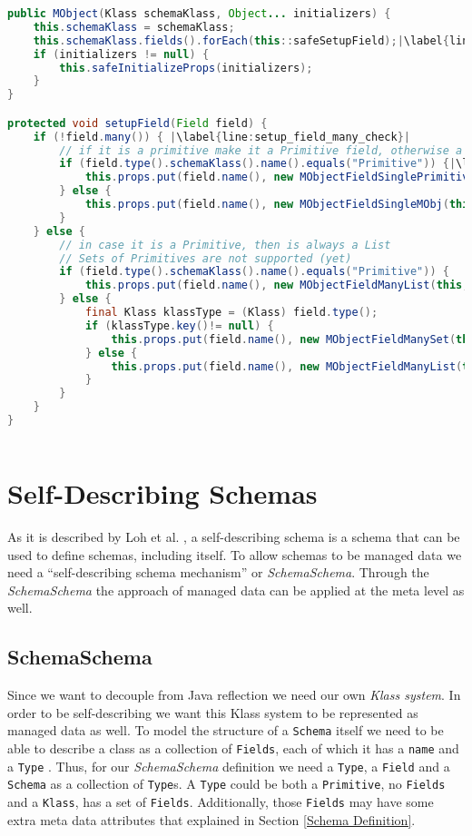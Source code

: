 \begin{sourcecode} [H]
	\begin{lstlisting}[language=Java, escapechar=|]
public MObject(Klass schemaKlass, Object... initializers) {
	this.schemaKlass = schemaKlass;
	this.schemaKlass.fields().forEach(this::safeSetupField);|\label{line:setup_fields}|
	if (initializers != null) {
		this.safeInitializeProps(initializers);
	}
}

protected void setupField(Field field) {
	if (!field.many()) { |\label{line:setup_field_many_check}|
		// if it is a primitive make it a Primitive field, otherwise a reference (managed object)
		if (field.type().schemaKlass().name().equals("Primitive")) {|\label{line:instanceof}|
			this.props.put(field.name(), new MObjectFieldSinglePrimitive(this, field));
		} else {
			this.props.put(field.name(), new MObjectFieldSingleMObj(this, field));
		}
	} else {
		// in case it is a Primitive, then is always a List
		// Sets of Primitives are not supported (yet)
		if (field.type().schemaKlass().name().equals("Primitive")) {
			this.props.put(field.name(), new MObjectFieldManyList(this, field));
		} else {
			final Klass klassType = (Klass) field.type();
			if (klassType.key()!= null) {
				this.props.put(field.name(), new MObjectFieldManySet(this, field));
			} else {
				this.props.put(field.name(), new MObjectFieldManyList(this, field));
			}
		}
	}
}
	\end{lstlisting}
	\caption{MObject: setup fields}
	\label{lst:setup_fields}
\end{sourcecode}

\section{Self-Describing Schemas}\label{Self-Describing Schemas}
As it is described by Loh et al. \cite{loh2012managed}, a self-describing schema is a schema that can be used to define schemas, including itself.
To allow schemas to be managed data we need a ``self-describing schema mechanism'' or \textit{SchemaSchema}.
Through the \textit{SchemaSchema} the approach of managed data can be applied at the meta level as well.

\subsection{SchemaSchema}\label{sec:SchemaSchema}
Since we want to decouple from Java reflection we need our own \textit{Klass system}. 
In order to be self-describing we want this Klass system to be represented as managed data as well. 
To model the structure of a \texttt{Schema} itself we need to be able to describe a class as a collection of \texttt{Fields}, each of which it has a \texttt{name} and a \texttt{Type} \cite{loh2012managed}. 
Thus, for our \textit{SchemaSchema} definition we need a \texttt{Type}, a \texttt{Field} and a \texttt{Schema} as a collection of \texttt{Type}s. 
A \texttt{Type} could be both a \texttt{Primitive}, no \texttt{Fields} and a \texttt{Klass}, has a set of \texttt{Fields}.
Additionally, those \texttt{Fields} may have some extra meta data attributes that explained in Section \ref{Schema Definition}.


